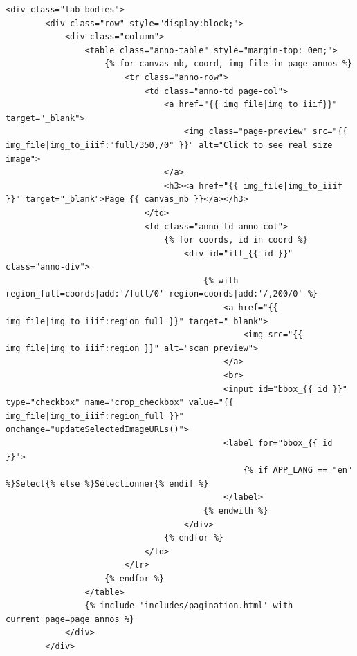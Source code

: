 \begin{lstlisting}[language=HTML5, frame=single, breaklines=true, caption={Template \html pour l'affichage des crops de diagrammes.}]
    <div class="tab-bodies">
        <div class="row" style="display:block;">
            <div class="column">
                <table class="anno-table" style="margin-top: 0em;">
                    {% for canvas_nb, coord, img_file in page_annos %}
                        <tr class="anno-row">
                            <td class="anno-td page-col">
                                <a href="{{ img_file|img_to_iiif}}" target="_blank">
                                    <img class="page-preview" src="{{ img_file|img_to_iiif:"full/350,/0" }}" alt="Click to see real size image">
                                </a>
                                <h3><a href="{{ img_file|img_to_iiif }}" target="_blank">Page {{ canvas_nb }}</a></h3>
                            </td>
                            <td class="anno-td anno-col">
                                {% for coords, id in coord %}
                                    <div id="ill_{{ id }}" class="anno-div">
                                        {% with region_full=coords|add:'/full/0' region=coords|add:'/,200/0' %}
                                            <a href="{{ img_file|img_to_iiif:region_full }}" target="_blank">
                                                <img src="{{ img_file|img_to_iiif:region }}" alt="scan preview">
                                            </a>
                                            <br>
                                            <input id="bbox_{{ id }}" type="checkbox" name="crop_checkbox" value="{{ img_file|img_to_iiif:region_full }}" onchange="updateSelectedImageURLs()">
                                            <label for="bbox_{{ id }}">
                                                {% if APP_LANG == "en" %}Select{% else %}Sélectionner{% endif %}
                                            </label>
                                        {% endwith %}
                                    </div>
                                {% endfor %}
                            </td>
                        </tr>
                    {% endfor %}
                </table>
                {% include 'includes/pagination.html' with current_page=page_annos %}
            </div>
        </div>


\end{lstlisting}
